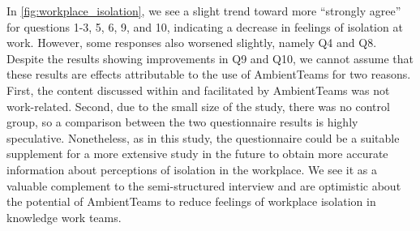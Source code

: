 In \autoref{fig:workplace_isolation}, we see a slight trend toward more \enquote{strongly agree} for questions 1-3, 5, 6, 9, and 10, indicating a decrease in feelings of isolation at work. However, some responses also worsened slightly, namely Q4 and Q8. Despite the results showing improvements in Q9 and Q10, we cannot assume that these results are effects attributable to the use of AmbientTeams for two reasons. First, the content discussed within and facilitated by AmbientTeams was not work-related. Second, due to the small size of the study, there was no control group, so a comparison between the two questionnaire results is highly speculative. Nonetheless, as in this study, the questionnaire could be a suitable supplement for a more extensive study in the future to obtain more accurate information about perceptions of isolation in the workplace. We see it as a valuable complement to the semi-structured interview and are optimistic about the potential of AmbientTeams to reduce feelings of workplace isolation in knowledge work teams.


